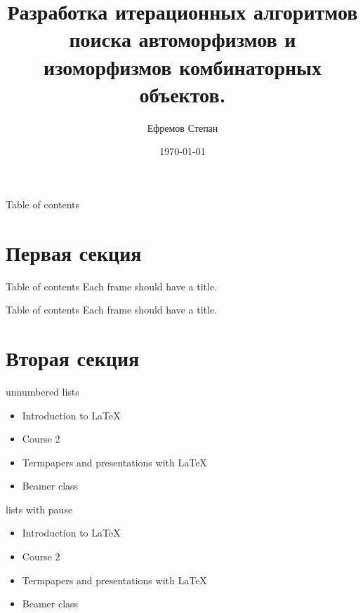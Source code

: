 \documentclass{beamer}
\begin{document}
\title{Разработка итерационных алгоритмов поиска автоморфизмов
и изоморфизмов комбинаторных объектов.}
\author{Ефремов Степан} 
\date{\today} 


\begin{frame}{}
\titlepage 
\end{frame}


\begin{frame}{Table of contents}
\tableofcontents
\end{frame} 


\section{Первая секция}
\begin{frame}{Table of contents}
Each frame should have a title.
\end{frame} 


\begin{frame}{Table of contents}
Each frame should have a title.
\end{frame} 


\section{Вторая секция}
\begin{frame}{unnumbered lists}
\begin{itemize}
\item Introduction to  \LaTeX  
\item Course 2 
\item Termpapers and presentations with \LaTeX 
\item Beamer class
\end{itemize} 
\end{frame}


\begin{frame}{lists with pause}
\begin{itemize}
\item Introduction to  \LaTeX \pause 
\item Course 2 \pause 
\item Termpapers and presentations with \LaTeX \pause 
\item Beamer class
\end{itemize} 
\end{frame}
\end{document}
